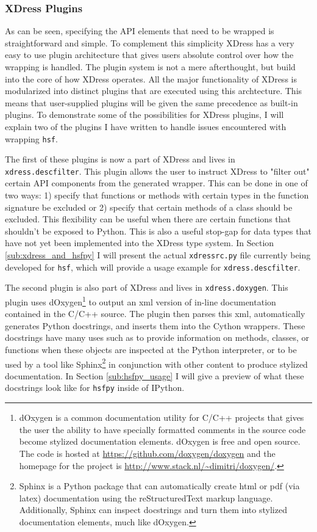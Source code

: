   \subsubsection{XDress Plugins} \label{ssub:xdress_plugins}

    As can be seen, specifying the API elements that need to be wrapped is straightforward and simple. To complement this simplicity XDress has a very easy to use plugin architecture that gives users absolute control over how the wrapping is handled. The plugin system is not a mere afterthought, but build into the core of how XDress operates. All the major functionality of XDress is modularized into distinct plugins that are executed using this archtecture. This means that user-supplied plugins will be given the same precedence as built-in plugins. To demonstrate some of the possibilities for XDress plugins, I will explain two of the plugins I have written to handle issues encountered with wrapping \texttt{hsf}.

    The first of these plugins is now a part of XDress and lives in \texttt{xdress.descfilter}. This plugin allows the user to instruct XDress to "filter out" certain API components from the generated wrapper. This can be done in one of two ways: 1) specify that functions or methods with certain types in the function signature be excluded or 2) specify that certain methods of a class should be excluded. This flexibility can be useful when there are certain functions that shouldn't be exposed to Python. This is also a useful stop-gap for data types that have not yet been implemented into the XDress type system. In Section \ref{sub:xdress_and_hsfpy} I will present the actual \texttt{xdressrc.py} file currently being developed for \texttt{hsf}, which will provide a usage example for \texttt{xdress.descfilter}.

    The second plugin is also part of XDress and lives in  \texttt{xdress.doxygen}. This plugin uses dOxygen\footnote{dOxygen is a common documentation utility for C/C++ projects that gives the user the ability to have specially formatted comments in the source code become stylized documentation elements. dOxygen is free and open source. The code is hosted at \url{https://github.com/doxygen/doxygen} and the homepage for the project is \url{http://www.stack.nl/~dimitri/doxygen/}.} to output an xml version of in-line documentation contained in the C/C++ source. The plugin then parses this xml, automatically generates Python docstrings, and inserts them into the Cython wrappers. These docstrings have many uses such as to provide information on methods, classes, or functions when these objects are inspected at the Python interpreter, or to be used by a tool like Sphinx\footnote{Sphinx is a Python package that can automatically create html or pdf (via latex) documentation using the reStructuredText markup language. Additionally, Sphinx can inspect docstrings and turn them into stylized documentation elements, much like dOxygen.} in conjunction with other content to produce stylized documentation. In Section \ref{sub:hsfpy_usage} I will give a preview of what these docstrings look like for \texttt{hsfpy} inside of IPython.

